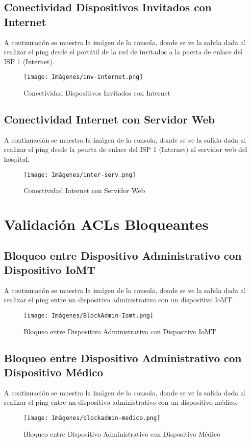 \subsection{Conectividad Dispositivos Invitados con Internet}\label{anexo:pruebaInv-Inter}
A continuación se muestra la imágen de la consola, donde se ve la salida dada al realizar el ping desde el portátil de la red de invitados a la puerta de enlace del ISP 1 (Internet).
\begin{figure}[H]
    \centering
    \texttt{[image: Imágenes/inv-internet.png]}
    \caption{Conectividad Dispositivos Invitados con Internet}
\end{figure}
\subsection{Conectividad Internet con Servidor Web}\label{anexo:pruebaInter-Serv}
A continuación se muestra la imágen de la consola, donde se ve la salida dada al realizar el ping desde la peurta de enlace del ISP 1 (Internet) al servidor web del hospital.
\begin{figure}[H]
    \centering
    \texttt{[image: Imágenes/inter-serv.png]}
    \caption{Conectividad Internet con Servidor Web}
\end{figure}

\section{Validación ACLs Bloqueantes}
\subsection{Bloqueo entre Dispositivo Administrativo con Dispositivo IoMT}\label{anexo:blockadmin-iomt}
A continuación se muestra la imágen de la consola, donde se ve la salida dada al realizar el ping entre un dispositivo administrativo con un dispositivo IoMT.
\begin{figure}[H]
    \centering
    \texttt{[image: Imágenes/BlockAdmin-Iomt.png]}
    \caption{Bloqueo entre Dispositivo Administrativo con Dispositivo IoMT}
\end{figure}
\subsection{Bloqueo entre Dispositivo Administrativo con Dispositivo Médico}\label{anexo:blockadmin-med}
A continuación se muestra la imágen de la consola, donde se ve la salida dada al realizar el ping entre un dispositivo administrativo con un dispositivo médico.
\begin{figure}[H]
    \centering
    \texttt{[image: Imágenes/blockadmin-medico.png]}
    \caption{Bloqueo entre Dispositivo Administrativo con Dispositivo Médico}
\end{figure}

